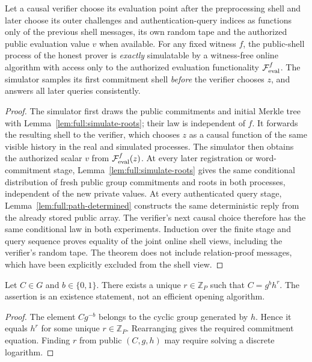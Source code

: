 \begin{theorem}\label{thm:full:shell-online}
Let a causal verifier choose its
evaluation point after the
preprocessing shell and later
choose its outer challenges and
authentication-query indices
as functions only of the
previous shell messages,
its own random tape and the
authorized public evaluation
value $v$ when available.
For any fixed witness $f$,
the public-shell process of
the honest prover is
\emph{exactly} simulatable by
a witness-free online algorithm
with access only to the
authorized evaluation
functionality
$\mathcal F_{\rm eval}^{f}$.
The simulator samples its
first commitment shell
\emph{before} the verifier
chooses $z$, and answers all
later queries consistently.
\end{theorem}
\begin{proof}
The simulator first draws
the public commitments and
initial Merkle tree with
Lemma~\ref{lem:full:simulate-roots};
their law is independent of $f$.
It forwards the resulting shell
to the verifier, which chooses
$z$ as a causal function of
the same visible history in
the real and simulated processes.
The simulator then obtains the
authorized scalar $v$ from
$\mathcal F_{\rm eval}^{f}(z)$.
At every later registration
or word-commitment stage,
Lemma~\ref{lem:full:simulate-roots}
gives the same conditional
distribution of fresh public
group commitments and roots
in both processes, independent
of the new private values.
At every authenticated query
stage, Lemma~\ref{lem:full:path-determined}
constructs the same deterministic
reply from the already stored
public array. The verifier's
next causal choice therefore
has the same conditional law
in both experiments.
Induction over the finite
stage and query sequence
proves equality of the joint
online shell views, including
the verifier's random tape.
The theorem does not include
relation-proof messages,
which have been explicitly
excluded from the shell view.
\end{proof}

\begin{lemma}\label{lem:full:exist-opening}
Let $C\in G$ and $b\in\{0,1\}$.
There exists a unique
$r\in\mathbb Z_P$ such that
$C=g^bh^r$.
The assertion is an existence
statement, not an efficient
opening algorithm.
\end{lemma}
\begin{proof}
The element $Cg^{-b}$ belongs
to the cyclic group generated
by $h$. Hence it equals
$h^r$ for some unique
$r\in\mathbb Z_P$.
Rearranging gives the
required commitment equation.
Finding $r$ from public
$(C,g,h)$ may require
solving a discrete logarithm.
\end{proof}

